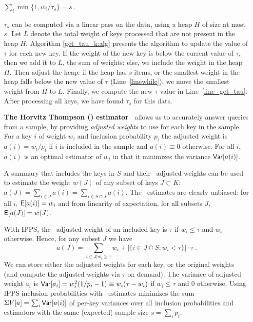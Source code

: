 \documentclass[11pt]{article}
\begin{document}
\smallskip
\centerline{
$\sum_i \min\{1, w_i/\tau_s\} =s\ .$
}
\smallskip
\noindent
 $\tau_s$ can be computed via a linear pass on the data, using a
heap $H$ of size at most $s$. 
Let $L$ denote the total weight of keys processed that are not present
in the heap $H$. 
Algorithm \ref{get_tau_k:alg} presents the algorithm to update the
value of $\tau$ for each new key. 
If the weight of the new key is below the current value of $\tau$,
then we add it to $L$, the sum of weights; else, we include the weight
in the heap $H$. 
Then adjust the heap: if the heap has $s$ items, or the smallest
weight in the heap falls below the new value of $\tau$
(Line~\ref{linewhile}), we move the smallest weight from $H$ to
$L$. 
Finally, we compute the new $\tau$ value in Line~\ref{line_get_tau}. 
After processing all keys, we have found $\tau_s$ for this data.



\medskip
\noindent
{\bf The Horvitz Thompson (\HT) estimator~\cite{HT52}} 
allows us to accurately answer queries from a sample, by 
providing {\em adjusted weights} to use for each key in the sample. 
For a key $i$ of weight $w_i$ and inclusion probability $p_i$ the 
adjusted weight is $a(i)=w_i/p_i$ if $i$ is included in
the sample and $a(i)\equiv 0$ otherwise.  
For all $i$, $a(i)$ is an optimal estimator of $w_i$ in that it minimizes 
the variance $\mathop{\sf Var}[a(i)]$.  

 A summary that includes the keys in $S$ and 
their \HT\ adjusted weights can be used to 
estimate the weight $w(J)$ of any subset of keys $J\subset K$: 
 $a(J)=\sum_{i\in J} a(i)=\sum_{i\in {S\cap J}} a(i)$.
 The \HT\ estimates are clearly
unbiased: for all $i$, $\textsf{E}[a(i)]=w_i$ and from linearity of expectation,
for all subsets $J$, $\textsf{E}[a(J)]=w(J)$.  

With IPPS, the \HT\ adjusted weight of an included key
is $\tau$ if $w_i\leq \tau $ and $w_i$ otherwise.  
Hence, for any subset $J$ we have
\begin{equation} \label{ipps_est_subset}
\textstyle
a(J)=\sum_{i\in J | w_i\geq \tau} w_i + \left\vert\{ i\in J\cap S : w_i<\tau \}\right| \cdot \tau\ .
\end{equation}
We can store either the adjusted weights for
each key, or the original weights (and compute the adjusted weights
via $\tau$ on demand). 
The variance of adjusted weight $a_i$ 
is $\mathop{\sf Var}[a_i]=w_i^2(1/p_i-1)\equiv w_i(\tau-w_i)$ 
if $w_i\leq \tau$ and $0$ otherwise. 
Using IPPS inclusion probabilities with \HT\ estimates
minimizes the sum ${\Sigma}V[a]=\sum_i \mathop{\sf Var}[a(i)]$ of per-key variances 
over all inclusion probabilities and estimators with
the same (expected) sample size $s=\sum_i p_i$.
\end{document}

